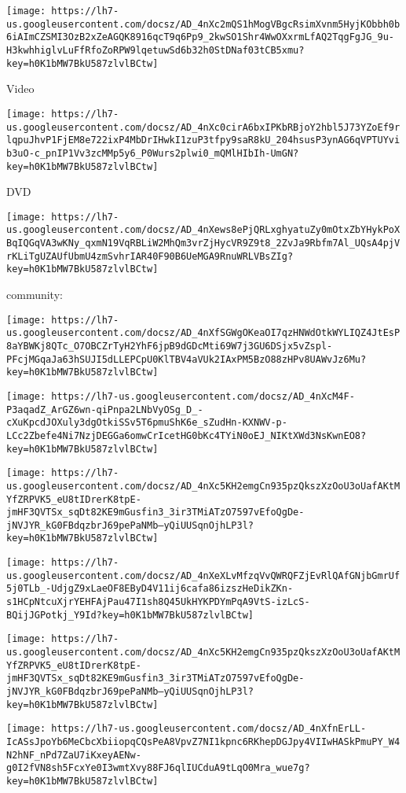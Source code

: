 \documentclass[
]{article}
\begin{document}
\texttt{[image: https://lh7-us.googleusercontent.com/docsz/AD\_4nXc2mQS1hMogVBgcRsimXvnm5HyjKObbh0b6iAImCZSMI3OzB2xZeAGQK8916qcT9q6Pp9\_2kwSO1Shr4WwOXxrmLfAQ2TqgFgJG\_9u-H3kwhhiglvLuFfRfoZoRPW9lqetuwSd6b32h0StDNaf03tCB5xmu?key=h0K1bMW7BkU587zlvlBCtw]}

Video

\texttt{[image: https://lh7-us.googleusercontent.com/docsz/AD\_4nXc0cirA6bxIPKbRBjoY2hbl5J73YZoEf9rlqpuJhvP1FjEM8e722ixP4MbDrIHwkI1zuP3tfpy9saR8kU\_204hsusP3ynAG6qVPTUYvib3uO-c\_pnIP1Vv3zcMMp5y6\_P0Wurs2plwi0\_mQMlHIbIh-UmGN?key=h0K1bMW7BkU587zlvlBCtw]}

DVD

\texttt{[image: https://lh7-us.googleusercontent.com/docsz/AD\_4nXews8ePjQRLxghyatuZy0mOtxZbYHykPoXBqIQGqVA3wKNy\_qxmN19VqRBLiW2MhQm3vrZjHycVR9Z9t8\_2ZvJa9Rbfm7Al\_UQsA4pjVrKLiTgUZAUfUbmU4zmSvhrIAR40F90B6UeMGA9RnuWRLVBsZIg?key=h0K1bMW7BkU587zlvlBCtw]}

community:

\texttt{[image: https://lh7-us.googleusercontent.com/docsz/AD\_4nXfSGWgOKeaOI7qzHNWdOtkWYLIQZ4JtEsP8aYBWKj8QTc\_O7OBCZrTyH2YhF6jpB9dGDcMti69W7j3GU6DSjx5vZspl-PFcjMGqaJa63hSUJI5dLLEPCpU0KlTBV4aVUk2IAxPM5BzO88zHPv8UAWvJz6Mu?key=h0K1bMW7BkU587zlvlBCtw]}

\texttt{[image: https://lh7-us.googleusercontent.com/docsz/AD\_4nXcM4F-P3aqadZ\_ArGZ6wn-qiPnpa2LNbVyOSg\_D\_-cXuKpcdJOXuly3dgOtkiSSv5T6pmuShK6e\_sZudHn-KXNWV-p-LCc2Zbefe4Ni7NzjDEGGa6omwCrIcetHG0bKc4TYiN0oEJ\_NIKtXWd3NsKwnEO8?key=h0K1bMW7BkU587zlvlBCtw]}

\texttt{[image: https://lh7-us.googleusercontent.com/docsz/AD\_4nXc5KH2emgCn935pzQkszXzOoU3oUafAKtMYfZRPVK5\_eU8tIDrerK8tpE-jmHF3QVTSx\_sqDt82KE9mGusfin3\_3ir3TMiATzO7597vEfoQgDe-jNVJYR\_kG0FBdqzbrJ69pePaNMb--yQiUUSqnOjhLP3l?key=h0K1bMW7BkU587zlvlBCtw]}

\texttt{[image: https://lh7-us.googleusercontent.com/docsz/AD\_4nXeXLvMfzqVvQWRQFZjEvRlQAfGNjbGmrUf5j0TLb\_-UdjgZ9xLaeOF8EByD4V11ij6cafa86izszHeDikZKn-s1HCpNtcuXjrYEHFAjPau47I1sh8Q45UkHYKPDYmPqA9VtS-izLcS-BQijJGPotkj\_Y9Id?key=h0K1bMW7BkU587zlvlBCtw]}

\texttt{[image: https://lh7-us.googleusercontent.com/docsz/AD\_4nXc5KH2emgCn935pzQkszXzOoU3oUafAKtMYfZRPVK5\_eU8tIDrerK8tpE-jmHF3QVTSx\_sqDt82KE9mGusfin3\_3ir3TMiATzO7597vEfoQgDe-jNVJYR\_kG0FBdqzbrJ69pePaNMb--yQiUUSqnOjhLP3l?key=h0K1bMW7BkU587zlvlBCtw]}

\texttt{[image: https://lh7-us.googleusercontent.com/docsz/AD\_4nXfnErLL-IcASsJpoYb6MeCbcXbiiopqCQsPeA8VpvZ7NI1kpnc6RKhepDGJpy4VIIwHASkPmuPY\_W4N2hNF\_nPd7ZaU7iKxeyAENw-g0I2fVN8sh5FcxYe0I3wmtXvy88FJ6qlIUCduA9tLqO0Mra\_wue7g?key=h0K1bMW7BkU587zlvlBCtw]}
\end{document}
